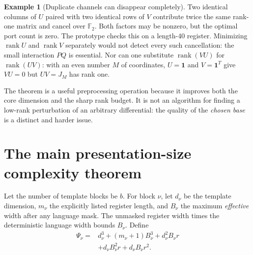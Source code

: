 \documentclass[11pt,letterpaper]{article}
\newcommand{\F}{{\mathbb F_2}}
\newcommand{\rk}{\operatorname{rank}}
\newcommand{\one}{\mathbf 1}
\theoremstyle{definition}
\newtheorem{example}[theorem]{Example}
\theoremstyle{remark}
\numberwithin{equation}{section}
\begin{document}
\begin{example}[Duplicate channels can disappear completely]
Two identical columns of $U$ paired with two identical rows of $V$
contribute twice the same rank-one matrix and cancel over $\F$.
Both factors may be nonzero, but the optimal port count is zero. The
prototype checks this on a length-40 register. Minimizing $\rk U$ and
$\rk V$ separately would not detect every such cancellation: the small
interaction $PQ$ is essential. Nor can one substitute $\rk(VU)$ for
$\rk(UV)$: with an even number $M$ of coordinates, $U=\one$ and
$V=\one^T$ give $VU=0$ but $UV=J_M$ has rank one.
\end{example}

The theorem is a useful preprocessing operation because it improves both
the core dimension and the sharp rank budget. It is not an algorithm for
finding a low-rank perturbation of an arbitrary differential: the quality
of the \emph{chosen base} is a distinct and harder issue.

\section{The main presentation-size complexity theorem}
\label{sec:complexity}

Let the number of template blocks be $b$. For block $\nu$, let $d_\nu$ be
the template dimension, $m_\nu$ the explicitly listed register length, and
$B_\nu$ the maximum \emph{effective} width after any language mask. The
unmasked register width times the deterministic language width bounds
$B_\nu$. Define
\begin{equation}
 \begin{split}
 \Psi_\nu={}&d_\nu^3+(m_\nu+1)B_\nu^3+d_\nu^2B_\nu r\\
             &+d_\nu B_\nu^2r+d_\nu B_\nu r^2.
 \end{split}
 \label{eq:Psi}
\end{equation}
\end{document}
